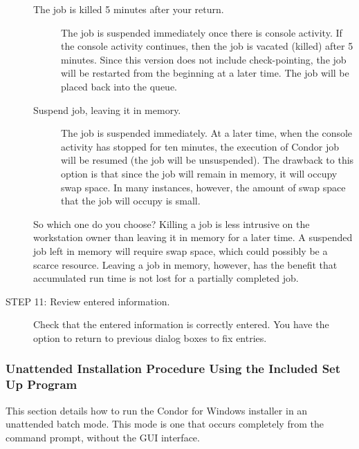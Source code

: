 \begin{description}
     \begin{description}
     \item[The job is killed 5 minutes after your return.]
     The job is suspended immediately once there is console activity.
     If the console activity continues, then the job is
     vacated (killed) after 5 minutes. 
     Since this version does not include check-pointing, the job will
     be restarted from the beginning at a later time.
     The job will be placed back into the queue.
     \item[ Suspend job, leaving it in memory.]
     The job is suspended immediately.  At a later time, when the
	 console activity has stopped for ten minutes, the execution of
	 Condor job will be resumed (the job will be unsuspended).
	 The drawback to this option is that since the job will remain
	 in memory, it will occupy swap space.  In many instances, however,
	 the amount of swap space that the job will occupy is small.
     \end{description}

     So which one do you choose?  Killing a job is less intrusive
	 on the workstation owner than leaving it in memory for a later time.
     A suspended job left in memory will require swap space,
     which could possibly be a scarce resource.
     Leaving a job in memory, however, has the benefit that accumulated
     run time is not lost for a partially completed job.

\item[STEP 11: Review entered information.]
     Check that the entered information is correctly entered.
     You have the option to return to previous dialog boxes to fix entries.
\end{description}


\subsubsection{\label{sec:nt-unattended-install-procedure}
Unattended Installation Procedure Using the Included Set Up Program}

This section details how to run the Condor for Windows installer in an
unattended batch mode.
This mode is one that occurs completely from the command prompt,
without the GUI interface.

